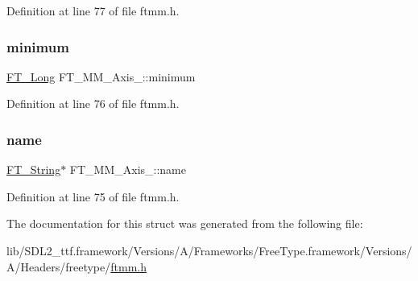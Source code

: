 Definition at line 77 of file ftmm.\+h.

\mbox{\label{struct_f_t___m_m___axis___a9dc31f02b350b1356e0896673b5b73a4}} 
\subsubsection{\texorpdfstring{minimum}{minimum}}
{\footnotesize\ttfamily \mbox{\hyperlink{fttypes_8h_a7fa72a1f0e79fb1860c5965789024d6f}{F\+T\+\_\+\+Long}} F\+T\+\_\+\+M\+M\+\_\+\+Axis\+\_\+\+::minimum}



Definition at line 76 of file ftmm.\+h.

\mbox{\label{struct_f_t___m_m___axis___a5c784efa44906c0e2b715eb1f866a09f}} 
\subsubsection{\texorpdfstring{name}{name}}
{\footnotesize\ttfamily \mbox{\hyperlink{fttypes_8h_a9846214585359eb2ba6bbb0e6de30639}{F\+T\+\_\+\+String}}$\ast$ F\+T\+\_\+\+M\+M\+\_\+\+Axis\+\_\+\+::name}



Definition at line 75 of file ftmm.\+h.



The documentation for this struct was generated from the following file\+:\begin{DoxyCompactItemize}
\item 
lib/\+S\+D\+L2\+\_\+ttf.\+framework/\+Versions/\+A/\+Frameworks/\+Free\+Type.\+framework/\+Versions/\+A/\+Headers/freetype/\mbox{\hyperlink{ftmm_8h}{ftmm.\+h}}\end{DoxyCompactItemize}
